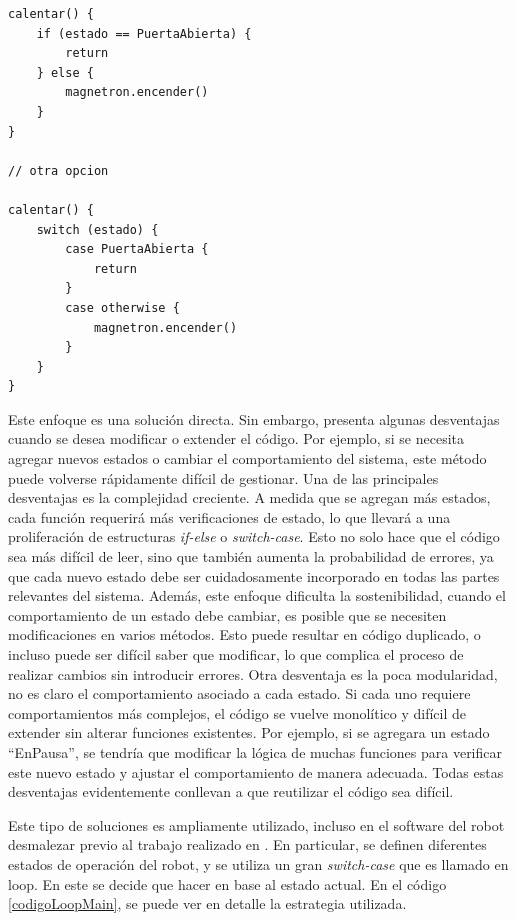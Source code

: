 \begin{lstlisting}[style=seudocode,label=codigoMicro,caption={Ejemplo de manejo de estados tradicional, en el caso del microondas.}]
calentar() {
    if (estado == PuertaAbierta) {
        return
    } else {
        magnetron.encender()
    }
}

// otra opcion

calentar() {
    switch (estado) {
    	case PuertaAbierta {
        	return
        }
    	case otherwise {
    	    magnetron.encender()
	    }
	}
}

\end{lstlisting}

Este enfoque es una solución directa. Sin embargo, presenta algunas desventajas cuando se desea modificar o extender el código. Por ejemplo, si se necesita agregar nuevos estados o cambiar el comportamiento del sistema, este método puede volverse rápidamente difícil de gestionar. Una de las principales desventajas es la complejidad creciente. A medida que se agregan más estados, cada función requerirá más verificaciones de estado, lo que llevará a una proliferación de estructuras \textit{if-else} o \textit{switch-case}. Esto no solo hace que el código sea más difícil de leer, sino que también aumenta la probabilidad de errores, ya que cada nuevo estado debe ser cuidadosamente incorporado en todas las partes relevantes del sistema. Además, este enfoque dificulta la sostenibilidad, cuando el comportamiento de un estado debe cambiar, es posible que se necesiten modificaciones en varios métodos. Esto puede resultar en código duplicado, o incluso puede ser difícil saber que modificar, lo que complica el proceso de realizar cambios sin introducir errores. Otra desventaja es la poca modularidad, no es claro el comportamiento asociado a cada estado. Si cada uno requiere comportamientos más complejos, el código se vuelve monolítico y difícil de extender sin alterar funciones existentes. Por ejemplo, si se agregara un estado ``EnPausa'', se tendría que modificar la lógica de muchas funciones para verificar este nuevo estado y ajustar el comportamiento de manera adecuada. Todas estas desventajas evidentemente conllevan a que reutilizar el código sea difícil.

Este tipo de soluciones es ampliamente utilizado, incluso en el software del robot desmalezar previo al trabajo realizado en \cite{paperPomponio}. En particular, se definen diferentes estados de operación del robot, y se utiliza un gran \textit{switch-case} que es llamado en loop. En este se decide que hacer en base al estado actual. En el código \ref{codigoLoopMain}, se puede ver en detalle la estrategia utilizada.

